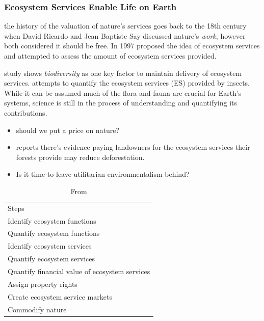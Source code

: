 \documentclass[
  letterpaper,
  DIV=11,
  numbers=noendperiod]{scrartcl}
\providecommand{\tightlist}{%
  \setlength{\itemsep}{0pt}\setlength{\parskip}{0pt}}\usepackage{longtable,booktabs,array}
\begin{document}
\subsubsection{Ecosystem Services Enable Life on
Earth}\label{ecosystem-services-enable-life-on-earth}

\citet{historyEcosystemServices2010} the history of the valuation of
nature's services goes back to the 18th century when David Ricardo and
Jean Baptiste Say discussed nature's \emph{work}, however both
considered it should be free. In 1997
\citet{dailyNatureServicesSocietal1997} proposed the idea of ecosystem
services and \citet{costanzaValueWorldEcosystem1997} attempted to assess
the amount of ecosystem services provided.

\citet{leprovostSupplyMultipleEcosystem2022} study shows
\emph{biodiversity} as one key factor to maintain delivery of ecosystem
services. \citet{noriegaResearchTrendsEcosystem2018} attempts to
quantify the ecosystem services (ES) provided by insects. While it can
be assumed much of the flora and fauna are crucial for Earth's systems,
science is still in the process of understanding and quantifying its
contributions.

\begin{itemize}
\tightlist
\item
  \citet{MonetaryValuationNature2023} should we put a price on nature?
\item
  \citet{bousfieldCarbonPaymentsCan2022} reports there's evidence paying
  landowners for the ecosystem services their forests provide may reduce
  deforestation.
\item
  Is it time to leave utilitarian environmentalism behind?
  \citet{muradianEcosystemServicesNature2021}
\end{itemize}

\begin{longtable}[]{@{}l@{}}
\caption{From \citet{MonetaryValuationNature2023}}\tabularnewline
\toprule\noalign{}
\endfirsthead
\endhead
\bottomrule\noalign{}
\endlastfoot
9 Steps \\
Identify ecosystem functions \\
Quantify ecosystem functions \\
Identify ecosystem services \\
Quantify ecosystem services \\
Quantify financial value of ecosystem services \\
Assign property rights \\
Create ecosystem service markets \\
Commodify nature \\
\end{longtable}
\end{document}
